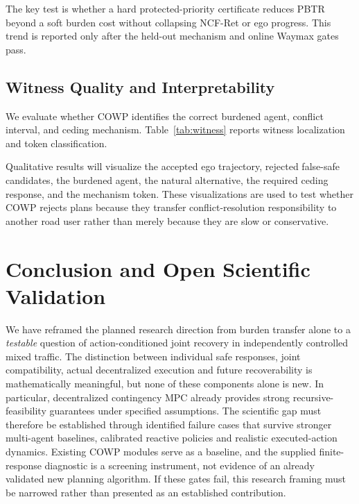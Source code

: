 \documentclass[10pt]{article}
\begin{document}
The key test is whether a hard protected-priority certificate reduces PBTR beyond a soft burden cost without collapsing NCF-Ret or ego progress. This trend is reported only after the held-out mechanism and online Waymax gates pass.

\subsection{Witness Quality and Interpretability}
\label{sec:witness_quality}

We evaluate whether COWP identifies the correct burdened agent, conflict interval, and ceding mechanism. Table~\ref{tab:witness} reports witness localization and token classification.

\begin{table}[t]
\centering
\caption{Coercion witness quality.}
\label{tab:witness}
\end{table}

Qualitative results will visualize the accepted ego trajectory, rejected false-safe candidates, the burdened agent, the natural alternative, the required ceding response, and the mechanism token. These visualizations are used to test whether COWP rejects plans because they transfer conflict-resolution responsibility to another road user rather than merely because they are slow or conservative.

\section{Conclusion and Open Scientific Validation}
\label{sec:conclusion}
We have reframed the planned research direction from burden transfer alone to a \emph{testable} question of action-conditioned joint recovery in independently controlled mixed traffic. The distinction between individual safe responses, joint compatibility, actual decentralized execution and future recoverability is mathematically meaningful, but none of these components alone is new. In particular, decentralized contingency MPC already provides strong recursive-feasibility guarantees under specified assumptions. The scientific gap must therefore be established through identified failure cases that survive stronger multi-agent baselines, calibrated reactive policies and realistic executed-action dynamics. Existing COWP modules serve as a baseline, and the supplied finite-response diagnostic is a screening instrument, not evidence of an already validated new planning algorithm. If these gates fail, this research framing must be narrowed rather than presented as an established contribution.
\end{document}
